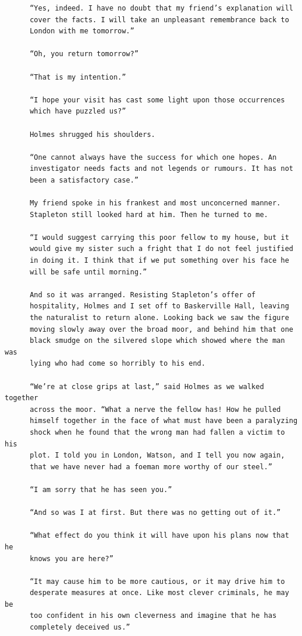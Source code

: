 \documentclass{article}
\begin{document}
\begin{verbatim}
      “Yes, indeed. I have no doubt that my friend’s explanation will
      cover the facts. I will take an unpleasant remembrance back to
      London with me tomorrow.”

      “Oh, you return tomorrow?”

      “That is my intention.”

      “I hope your visit has cast some light upon those occurrences
      which have puzzled us?”

      Holmes shrugged his shoulders.

      “One cannot always have the success for which one hopes. An
      investigator needs facts and not legends or rumours. It has not
      been a satisfactory case.”

      My friend spoke in his frankest and most unconcerned manner.
      Stapleton still looked hard at him. Then he turned to me.

      “I would suggest carrying this poor fellow to my house, but it
      would give my sister such a fright that I do not feel justified
      in doing it. I think that if we put something over his face he
      will be safe until morning.”

      And so it was arranged. Resisting Stapleton’s offer of
      hospitality, Holmes and I set off to Baskerville Hall, leaving
      the naturalist to return alone. Looking back we saw the figure
      moving slowly away over the broad moor, and behind him that one
      black smudge on the silvered slope which showed where the man was
      lying who had come so horribly to his end.

      “We’re at close grips at last,” said Holmes as we walked together
      across the moor. “What a nerve the fellow has! How he pulled
      himself together in the face of what must have been a paralyzing
      shock when he found that the wrong man had fallen a victim to his
      plot. I told you in London, Watson, and I tell you now again,
      that we have never had a foeman more worthy of our steel.”

      “I am sorry that he has seen you.”

      “And so was I at first. But there was no getting out of it.”

      “What effect do you think it will have upon his plans now that he
      knows you are here?”

      “It may cause him to be more cautious, or it may drive him to
      desperate measures at once. Like most clever criminals, he may be
      too confident in his own cleverness and imagine that he has
      completely deceived us.”


\end{verbatim}
\end{document}
